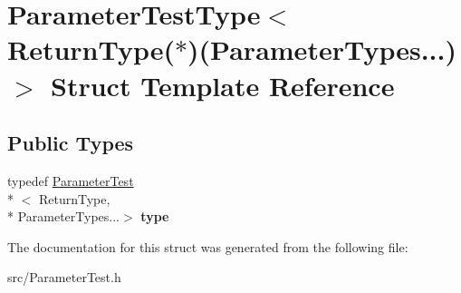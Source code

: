 \hypertarget{struct_parameter_test_type_3_01_return_type_07_5_08_07_parameter_types_8_8_8_08_4}{\section{Parameter\-Test\-Type$<$ Return\-Type($\ast$)(Parameter\-Types...)$>$ Struct Template Reference}
\label{struct_parameter_test_type_3_01_return_type_07_5_08_07_parameter_types_8_8_8_08_4}
}
\subsection*{Public Types}
\begin{DoxyCompactItemize}
\item 
\hypertarget{struct_parameter_test_type_3_01_return_type_07_5_08_07_parameter_types_8_8_8_08_4_a62e26353f1ef07147e372a4734308487}{typedef \hyperlink{class_parameter_test}{Parameter\-Test}\\*
$<$ Return\-Type, \\*
Parameter\-Types...$>$ {\bfseries type}}\label{struct_parameter_test_type_3_01_return_type_07_5_08_07_parameter_types_8_8_8_08_4_a62e26353f1ef07147e372a4734308487}

\end{DoxyCompactItemize}


The documentation for this struct was generated from the following file\-:\begin{DoxyCompactItemize}
\item 
src/Parameter\-Test.\-h\end{DoxyCompactItemize}

